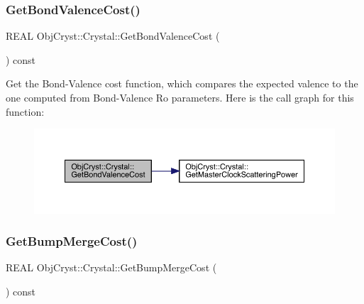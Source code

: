 \subsubsection{\texorpdfstring{GetBondValenceCost()}{GetBondValenceCost()}}
{\footnotesize\ttfamily R\+E\+AL Obj\+Cryst\+::\+Crystal\+::\+Get\+Bond\+Valence\+Cost (\begin{DoxyParamCaption}{ }\end{DoxyParamCaption}) const}

Get the Bond-\/\+Valence cost function, which compares the expected valence to the one computed from Bond-\/\+Valence Ro parameters. Here is the call graph for this function\+:
\nopagebreak
\begin{figure}[H]
\begin{center}
\leavevmode
\includegraphics[width=350pt]{class_obj_cryst_1_1_crystal_a1a2c5c9fed8417d83cef0ef3ff36418e_cgraph}
\end{center}
\end{figure}
\mbox{\label{class_obj_cryst_1_1_crystal_a9d7a5da6a0618589ee256a5bb8128ffa}} 
\subsubsection{\texorpdfstring{GetBumpMergeCost()}{GetBumpMergeCost()}}
{\footnotesize\ttfamily R\+E\+AL Obj\+Cryst\+::\+Crystal\+::\+Get\+Bump\+Merge\+Cost (\begin{DoxyParamCaption}{ }\end{DoxyParamCaption}) const}

